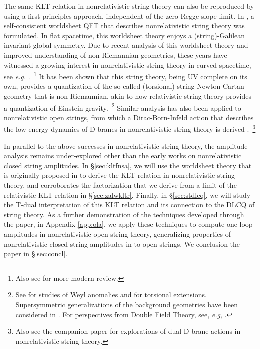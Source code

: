 \documentclass[11pt]{article}
\begin{document}
The same KLT relation in nonrelativistic string theory can also be reproduced by using a first principles approach, independent of the zero Regge slope limit. In \cite{Gomis:2000bd}, a self-consistent worldsheet QFT that describes nonrelativistic string theory was formulated. In flat spacetime, this worldsheet theory enjoys a (string)-Galilean invariant global symmetry. Due to recent analysis of this worldsheet theory and improved understanding of non-Riemannian geometries, these years have witnessed a growing interest in nonrelativistic string theory in curved spacetime, see \emph{e.g.} \cite{Andringa:2012uz, Bergshoeff:2018yvt}.~\footnote{Also see \cite{Bergshoeff:2019pij} for more modern review.} It has been shown that this string theory, being UV complete on its own, provides a quantization of the so-called (torsional) string Newton-Cartan geometry that is non-Riemannian, akin to how relativistic string theory provides a quantization of Einstein gravity.~\footnote{See \cite{Gomis:2019zyu, Yan:2019xsf, Gallegos:2019icg} for studies of Weyl anomalies and \cite{Harmark:2018cdl, Harmark:2019upf, Gallegos:2020egk, Bergshoeff:2021bmc, Yan:2021lbe, Bidussi:2021ujm} for torsional extensions. Supersymmetric generalizations of the background geometries have been considered in \cite{Gomis:2005pg, Park:2016sbw, Blair:2019qwi, Bergshoeff:2021tfn}. For perspectives from Double Field Theory, see, \emph{e.g}, \cite{Ko:2015rha, Park:2016sbw, Morand:2017fnv, Blair:2019qwi, Gallegos:2020egk, Blair:2020gng}.} Similar analysis has also been applied to nonrelativistic open strings, from which a Dirac-Born-Infeld action that describes the low-energy dynamics of D-branes in nonrelativistic string theory is derived \cite{Gomis:2020fui}.~\footnote{Also see the companion paper \cite{ddanst} for explorations of dual D-brane actions in nonrelativistic string theory.}

In parallel to the above successes in nonrelativistic string theory, the amplitude analysis remains under-explored other than the early works \cite{Gomis:2000bd, Danielsson:2000gi} on nonrelativistic closed string amplitudes. In \S\ref{sec:kltfnsa}, we will use the worldsheet theory that is originally proposed in \cite{Gomis:2000bd} to derive the KLT relation in nonrelativistic string theory, and corroborates the factorization that we derive from a limit of the relativistic KLT relation in \S\ref{sec:zalwkltr}. Finally, in \S\ref{sec:stdlcq}, we will study the T-dual interpretation of this KLT relation and its connection to the DLCQ of string theory. As a further demonstration of the techniques developed through the paper, in Appendix \ref{app:ola}, we apply these techniques to compute one-loop amplitudes in nonrelativistic open string theory, generalizing properties of nonrelativistic closed string amplitudes in \cite{Gomis:2000bd, Danielsson:2000gi} to open strings. We conclusion the paper in \S\ref{sec:concl}.
\end{document}
